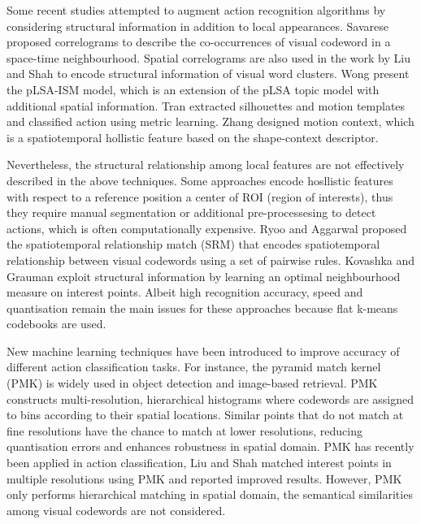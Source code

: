 Some recent studies attempted to augment action recognition algorithms by considering structural information in addition to local appearances. 
Savarese \etal \cite{Savarese2008} proposed correlograms to describe the co-occurrences of visual codeword in a space-time neighbourhood. Spatial correlograms are also used in the work by Liu and Shah \cite{Liu2008} to encode structural information of visual word clusters.  
Wong \etal \cite{Wong2007} present the pLSA-ISM model, which is an extension of the pLSA topic model \cite{Fergus2005} with additional spatial information. 
Tran \etal \cite{Tran2008} extracted silhouettes and motion templates and classified action using metric learning.  
Zhang \etal \cite{Zhang2008} designed motion context, which is a spatiotemporal hollistic feature based on the shape-context descriptor.  

Nevertheless, the structural relationship among local features are not effectively described in the above techniques. 
Some approaches \cite{Wong2007,Tran2008, Zhang2008} encode hosllistic features with respect to a reference position \eg a center of ROI (region of interests), thus they require manual segmentation or additional pre-processesing to detect actions, which is often computationally expensive.
Ryoo and Aggarwal \cite{Ryoo2009} proposed the spatiotemporal relationship match (SRM) that encodes spatiotemporal relationship between visual codewords using a set of pairwise rules. Kovashka and Grauman \cite{Kovashka2010} exploit structural information by learning an optimal neighbourhood measure on interest points. 
Albeit high recognition accuracy, speed and quantisation remain the main issues for these approaches because flat k-means codebooks are used.   

New machine learning techniques have been introduced to improve accuracy of different action classification tasks.  
For instance, the pyramid match kernel (PMK) \cite{Grauman2005} is widely used in object detection and image-based retrieval. PMK constructs multi-resolution, hierarchical histograms where codewords are assigned to bins according to their spatial locations. Similar points that do not match at fine resolutions have the chance to match at lower resolutions, reducing quantisation errors and enhances robustness in spatial domain. PMK has recently been applied in action classification, Liu and Shah \cite{Liu2008} matched interest points in multiple resolutions using PMK and reported improved results. 
However, PMK only performs hierarchical matching in spatial domain, the semantical similarities among visual codewords are not considered.  

